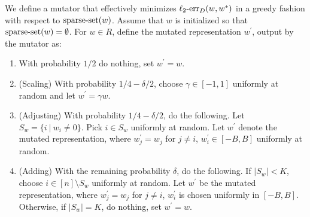 We define a mutator that effectively minimizes $\mathrm{\ell_2\mbox{-}err}_D(w, w^*)$ in a greedy
fashion with respect to $\mathrm{sparse\mbox{-}set}(w)$.
Assume that $w$ is initialized so that $\mathrm{sparse\mbox{-}set}(w) = \emptyset$.
For $w \in R$, define the mutated representation $w^\prime$, output by the mutator as:
\begin{enumerate}
\item With probability $1/2$ do nothing, set $w^\prime = w$.
\item (Scaling) With probability $1/4 - \delta/2$, choose $\gamma \in [-1, 1]$ uniformly at random and
let $w^\prime = \gamma w$.
\item (Adjusting) With probability $1/4 - \delta/2$, do the following. Let $S_w = \{ i~|~ w_i \neq 0
\}$. Pick $i \in S_w$ uniformly at random. Let $w^\prime$ denote the
mutated representation, where $w^\prime_j = w_j$ for $j \neq i$, $w^\prime_i \in
[-B, B]$ uniformly at random. 
\item (Adding) With the remaining probability $\delta$, do the following.
If $|S_w| < K$, choose $i \in [n] \setminus S_w$ uniformly at random. Let
$w^\prime$ be the mutated representation, where $w_j^\prime = w_j$ for $j \neq
i$, $w^\prime_i$ is chosen uniformly in $[-B, B]$. 
Otherwise, if $|S_w| = K$, do nothing, set $w^\prime = w$.
\end{enumerate}
